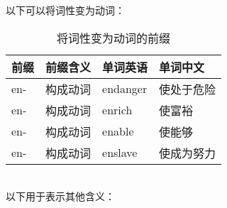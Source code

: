 \documentclass[UTF8]{ctexart}
\begin{document}
    以下可以将词性变为动词：
    \begin{table}[h!]
        \begin{center}
            \ttfamily
            \begin{tabular}{p{40pt}|p{80pt}|p{80pt}|p{80pt}}
                \hline
                前缀&前缀含义&单词英语&单词中文\\ \hline
                en-&构成动词&endanger&使处于危险\\ \hline
                en-&构成动词&enrich&使富裕\\ \hline
                en-&构成动词&enable&使能够\\ \hline
                en-&构成动词&enslave&使成为努力\\ \hline
            \end{tabular}
            \rmfamily
            \caption{将词性变为动词的前缀}
        \end{center}
    \end{table}\\
    以下用于表示其他含义：\vspace{5pt}
\end{document}
